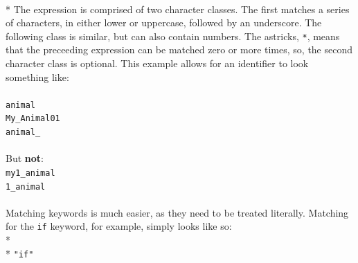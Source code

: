 \documentclass[12pt]{report}
\begin{document}
\\*
The expression is comprised of two character classes.  The first matches a series of characters, in either lower or uppercase, followed by an underscore. The following class is similar, but can also contain numbers.  The astricks, \texttt{*}, means that the preceeding expression can be matched zero or more times, so, the second character class is optional.  This example allows for an identifier to look something like:\\
\\
\texttt{animal}\\
\texttt{My\_Animal01}\\
\texttt{animal\_}\\
\\
But \textbf{not}:\\
\texttt{my1\_animal}\\
\texttt{1\_animal}\\
\\
Matching keywords is much easier, as they need to be treated literally.  Matching for the \texttt{if} keyword, for example, simply looks like so:\\*\\*
\texttt{"if"}
\end{document}
